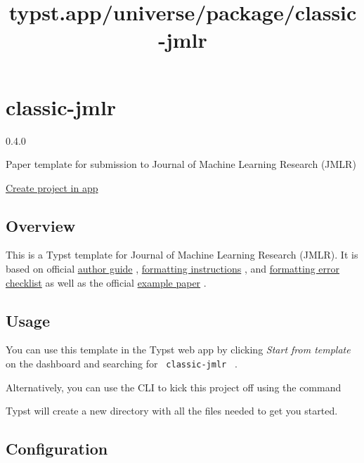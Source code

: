 \title{typst.app/universe/package/classic-jmlr}

\label{banner}
\label{template-thumbnail}

\section{classic-jmlr}\label{classic-jmlr}

{ 0.4.0 }

Paper template for submission to Journal of Machine Learning Research
(JMLR)

\href{/app?template=classic-jmlr&version=0.4.0}{Create project in app}

\label{readme}
\subsection{Overview}\label{overview}

This is a Typst template for Journal of Machine Learning Research
(JMLR). It is based on official
\href{https://www.jmlr.org/format/authors-guide.html}{author guide} ,
\href{https://www.jmlr.org/format/format.html}{formatting instructions}
, and
\href{https://www.jmlr.org/format/formatting-errors.html}{formatting
error checklist} as well as the official
\href{https://github.com/jmlrorg/jmlr-style-file}{example paper} .

\subsection{Usage}\label{usage}

You can use this template in the Typst web app by clicking \emph{Start
from template} on the dashboard and searching for
\texttt{\ classic-jmlr\ } .

Alternatively, you can use the CLI to kick this project off using the
command

\begin{Shaded}
\begin{Highlighting}[]
\end{Highlighting}
\end{Shaded}

Typst will create a new directory with all the files needed to get you
started.

\subsection{Configuration}\label{configuration}

